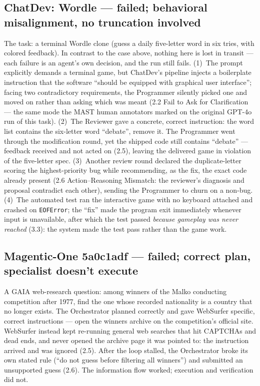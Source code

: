 \documentclass[10pt]{article}
\begin{document}
\subsection*{ChatDev: Wordle --- failed; behavioral misalignment, no truncation involved}
The task: a terminal Wordle clone (guess a daily five-letter word in six
tries, with colored feedback). In contrast to the case above, nothing here
is lost in transit --- each failure is an agent's own decision, and the run
still fails. (1)~The prompt explicitly demands a terminal game, but
ChatDev's pipeline injects a boilerplate instruction that the software
``should be equipped with graphical user interface''; facing two
contradictory requirements, the Programmer silently picked one and moved on
rather than asking which was meant (2.2 Fail to Ask for Clarification ---
the same mode the MAST human annotators marked on the original GPT-4o run
of this task). (2)~The Reviewer gave a concrete, correct instruction: the
word list contains the six-letter word ``debate'', remove it. The
Programmer went through the modification round, yet the shipped code still
contains ``debate'' --- feedback received and not acted on (2.5), leaving
the delivered game in violation of the five-letter spec. (3)~Another review
round declared the duplicate-letter scoring the highest-priority bug while
recommending, as the fix, the exact code already present (2.6
Action--Reasoning Mismatch: the reviewer's diagnosis and proposal
contradict each other), sending the Programmer to churn on a non-bug.
(4)~The automated test ran the interactive game with no keyboard attached
and crashed on \texttt{EOFError}; the ``fix'' made the program exit
immediately whenever input is unavailable, after which the test passed
\emph{because gameplay was never reached} (3.3): the system made the test
pass rather than the game work.

\subsection*{Magentic-One 5a0c1adf --- failed; correct plan, specialist doesn't execute}
A GAIA web-research question: among winners of the Malko conducting
competition after 1977, find the one whose recorded nationality is a country
that no longer exists. The Orchestrator planned correctly and gave WebSurfer
specific, correct instructions --- open the winners archive on the
competition's official site. WebSurfer instead kept re-running general web
searches that hit CAPTCHAs and dead ends, and never opened the archive page
it was pointed to: the instruction arrived and was ignored (2.5). After the
loop stalled, the Orchestrator broke its own stated rule (``do not guess
before filtering all winners'') and submitted an unsupported guess (2.6).
The information flow worked; execution and verification did not.
\end{document}
